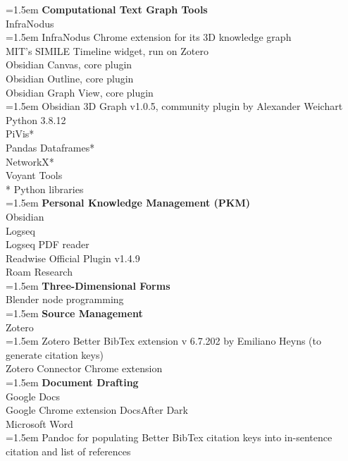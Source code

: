 \begin{multicols}{2}
\noindent\hangindent=1.5em \textbf{Computational Text Graph Tools} \\
InfraNodus \\
\RaggedRight \hangindent=1.5em  InfraNodus Chrome extension for its 3D knowledge graph \\
MIT’s SIMILE Timeline widget, run on Zotero \\
Obsidian Canvas, core plugin \\ 
Obsidian Outline, core plugin \\
Obsidian Graph View, core plugin \\
\RaggedRight \hangindent=1.5em Obsidian 3D Graph v1.0.5, community plugin by Alexander Weichart \\
Python 3.8.12 \\
PiVis* \\
Pandas Dataframes* \\
NetworkX* \\
Voyant Tools \\
* Python libraries \\
\vspace{4mm}
\noindent\hangindent=1.5em \textbf{Personal Knowledge Management (PKM)} \\
Obsidian \\
Logseq \\
Logseq PDF reader \\
Readwise Official Plugin v1.4.9 \\
Roam Research \\
\vspace{4mm}
\noindent\hangindent=1.5em \textbf{Three-Dimensional Forms} \\
Blender node programming \\
\vspace{4mm}
\noindent\hangindent=1.5em \textbf{Source Management} \\
Zotero \\
\RaggedRight \hangindent=1.5em Zotero Better BibTex extension v 6.7.202 by Emiliano Heyns (to generate citation keys) \\
Zotero Connector Chrome extension \\
\vspace{4mm}
\noindent\hangindent=1.5em \textbf{Document Drafting} \\
Google Docs \\
Google Chrome extension DocsAfter Dark \\
Microsoft Word \\
\RaggedRight \hangindent=1.5em Pandoc for populating Better BibTex citation keys into in-sentence citation and list of references \\

\end{multicols}
